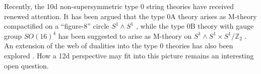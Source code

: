 Recently, the 10d non-supersymmetric type 0 string theories have received renewed attention.
It has been argued that the type 0A theory arises as M-theory compactified on a ``figure-8'' circle $S^1 \wedge S^1$ \cite{Baykara:2026gem}, while the type 0B theory with gauge group $SO(16)^4$ has been suggested to arise as M-theory on $S^1 \wedge S^1 \times S^1 / \mathbb{Z}_2$ \cite{Altavista:2026evd}.
An extension of the web of dualities into the type 0 theories has also been explored \cite{Baykara:2026gem, Baykara:2026vdc}.
How a 12d perspective may fit into this picture remains an interesting open question.